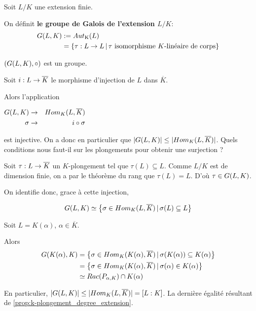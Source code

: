 \begin{definition} 
	Soit $L/K$ une extension finie.

	On définit \textbf{le groupe de Galois de l'extension $L/K$}:
	\begin{align}
		G(L, K) & := Aut_{\text{K}}(L) \\
		& = \left\{\tau : L \rightarrow L \, | \, \text{$\tau$ isomorphisme
		$K$-linéaire de corps} \right\}
	\end{align}

	$(G(L, K), \circ)$ est un groupe.
\end{definition}

Soit $i : L \rightarrow \overline{K}$ le morphisme d'injection de $L$ dans
$\overline{K}$.

Alors l'application

\begin{center}
$
\begin{aligned}
	G(L, K) &\rightarrow& Hom_{K}(L, \overline{K}) \\
	\sigma &\rightarrow& i \circ \sigma
\end{aligned}
$
\end{center}

est injective. On a donc en particulier que $|G(L, K)|
\leq |Hom_{K}(L, \overline{K})|$. Quels conditions nous faut-il
sur les plongements pour obtenir une surjection ?

Soit $\tau : L \rightarrow \overline{K}$ un $K$-plongement tel que $\tau(L)
\subseteq L$. Comme $L/K$ est de dimension finie, on a par le théorème du rang
que $\tau(L) = L$.
D'où $\tau \in G(L, K)$.

On identifie donc, grace à cette injection,

\begin{equation}
	G(L, K) \simeq \left\{\sigma \in
	Hom_{K}(L, \overline{K}) \, | \, \sigma(L) \subseteq L \right\}
\end{equation}

\begin{exemple}
	Soit $L = K(\alpha)$, $\alpha \in \overline{K}$.

	Alors
	\begin{align}
		G(K(\alpha), K)
		& = \left\{\sigma \in
			Hom_{K}(K(\alpha), \overline{K}) \, | \, \sigma(K(\alpha)) \subseteq
			K(\alpha) \right\} \\
		& = \left\{\sigma \in
			Hom_{K}(K(\alpha), \overline{K}) \, | \, \sigma(\alpha) \in
			K(\alpha) \right\} \\
		& \simeq Rac(P_{\alpha, K}) \cap K(\alpha)
	\end{align}

	En particulier, $|G(L, K)| \leq
	|Hom_{K}(L, \overline{K})| = [L : K]$. La
	dernière égalité résultant de \ref{prop:k-plongement_degree_extension}.
\end{exemple}

